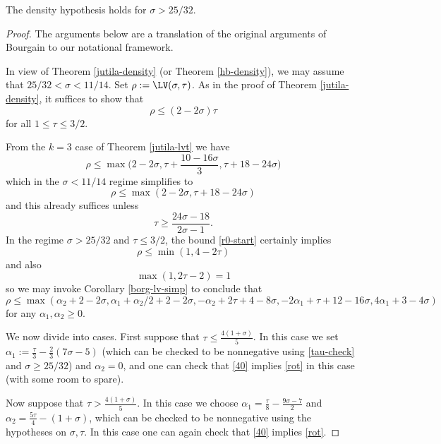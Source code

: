 \begin{theorem}\label{bourgain-density} The density hypothesis holds for $\sigma > 25/32$.
\end{theorem}

\literature
{}

\begin{proof}  The arguments below are a translation of the original arguments of Bourgain \cite{bourgain_large_2000} to our notational framework.

In view of Theorem \ref{jutila-density} (or Theorem \ref{hb-density}), we may assume that $25/32 < \sigma < 11/14$.  Set $\rho := \LV(\sigma,\tau)$. As in the proof of Theorem \ref{jutila-density}, it suffices to show that
\begin{equation}\label{rot}
    \rho \leq (2-2\sigma) \tau
\end{equation}
for all $1 \leq \tau \leq 3/2$.

From the $k=3$ case of Theorem \ref{jutila-lvt} we have
\begin{equation}\label{rhomax}
    \rho \leq \max \bigg(2-2\sigma, \tau + \frac{10-16\sigma}{3}, \tau + 18-24\sigma \bigg)
\end{equation}
which in the $\sigma < 11/14$ regime simplifies to
\begin{equation}\label{r0-start}
\rho \leq \max(2-2\sigma, \tau + 18-24\sigma)
\end{equation}
and this already suffices unless
\begin{equation}\label{tau-check}
     \tau \geq \frac{24\sigma-18}{2\sigma-1}.
\end{equation}
In the regime $\sigma > 25/32$ and $\tau \leq 3/2$, the bound \eqref{r0-start} certainly implies
$$ \rho \leq \min(1, 4-2\tau)$$
and also
$$ \max(1,2\tau-2) = 1$$
so we may invoke Corollary \ref{borg-lv-simp} to conclude that
\begin{equation}\label{40}
     \rho \leq \max( \alpha_2 + 2 - 2 \sigma, \alpha_1+\alpha_2/2 + 2-2\sigma, -\alpha_2 + 2\tau+4-8\sigma, -2\alpha_1 + \tau + 12 - 16 \sigma, 4\alpha_1 + 3-4\sigma)
\end{equation}
for any $\alpha_1, \alpha_2 \geq 0$.

We now divide into cases.  First suppose that $\tau \leq \frac{4(1+\sigma)}{5}$.  In this case we set $\alpha_1 := \frac{\tau}{3} - \frac{2}{3} (7\sigma-5)$ (which can be checked to be nonnegative using \eqref{tau-check} and $\sigma \geq 25/32$) and $\alpha_2=0$, and one can check that \eqref{40} implies \eqref{rot} in this case (with some room to spare).

Now suppose that $\tau > \frac{4(1+\sigma)}{5}$.  In this case we choose $\alpha_1 = \frac{\tau}{8} - \frac{9\sigma-7}{2}$ and $\alpha_2 = \frac{5\tau}{4} - (1+\sigma)$, which can be checked to be nonnegative using the hypotheses on $\sigma,\tau$.  In this case
one can again check that \eqref{40} implies \eqref{rot}.
\end{proof}

